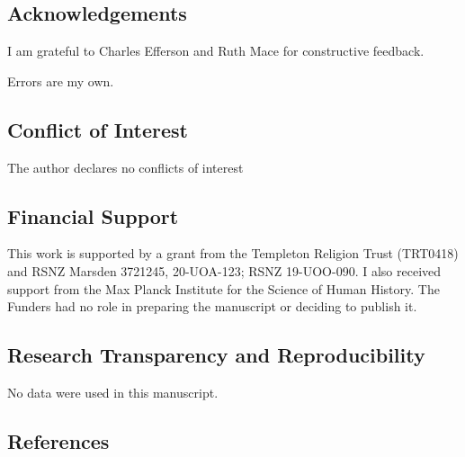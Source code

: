 \documentclass[
  single column]{article}
\begin{document}
\newpage{}

\subsection{Acknowledgements}\label{acknowledgements}

I am grateful to Charles Efferson and Ruth Mace for constructive
feedback.

Errors are my own.

\subsection{Conflict of Interest}\label{conflict-of-interest}

The author declares no conflicts of interest

\subsection{Financial Support}\label{financial-support}

This work is supported by a grant from the Templeton Religion Trust
(TRT0418) and RSNZ Marsden 3721245, 20-UOA-123; RSNZ 19-UOO-090. I also
received support from the Max Planck Institute for the Science of Human
History. The Funders had no role in preparing the manuscript or deciding
to publish it.

\subsection{Research Transparency and
Reproducibility}\label{research-transparency-and-reproducibility}

No data were used in this manuscript.

\newpage{}

\subsection{References}\label{references}
\end{document}
